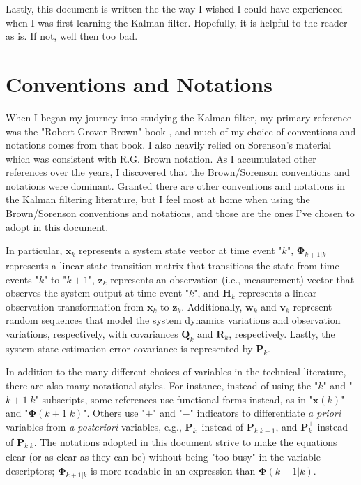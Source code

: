 \documentclass[12pt]{article}
\begin{document}
Lastly, this document is written the the way I wished I could have experienced when I was
first learning the Kalman filter. Hopefully, it is helpful to the reader as is.
If not, well then too bad.

\clearpage



\section{Conventions and Notations}

When I began my journey into studying the Kalman filter, my primary reference was the
"Robert Grover Brown" book \cite{rgbrown1983}, and much of my choice of conventions and
notations comes from that book. I also heavily relied on Sorenson’s material
\cite{sorenson1985} which was consistent with R.G. Brown notation. As I accumulated other
references over the years, I discovered that the Brown/Sorenson conventions and notations
were dominant. Granted there are other conventions and notations in the Kalman filtering
literature, but I feel most at home when using the Brown/Sorenson conventions and notations,
and those are the ones I’ve chosen to adopt in this document.

In particular, $\mathbf{x}_k$ represents a system state vector at time event "$k$",
$\mathbf{\Phi}_{k+1|k}$ represents a linear state transition matrix that transitions the
state from time events "$k$" to "$k+1$",
$\mathbf{z}_k$ represents an observation (i.e., measurement) vector that observes the
system output at time event "$k$",
and $\mathbf{H}_k$ represents a linear observation transformation from $\mathbf{x}_k$
to $\mathbf{z}_k$.
Additionally, $\mathbf{w}_k$ and $\mathbf{v}_k$ represent random sequences that model the
system dynamics variations and observation variations, respectively, with covariances
$\mathbf{Q}_k$ and $\mathbf{R}_k$, respectively.
Lastly, the system state estimation error covariance is represented by $\mathbf{P}_k$.

In addition to the many different choices of variables in the technical literature, there
are also many notational styles.
For instance, instead of using the "$k$" and "$k+1|k$" subscripts, some references use
functional forms instead, as in "$\mathbf{x}(k)$" and "$\mathbf{\Phi}(k+1|k)$".
Others use "$+$" and "$-$" indicators to differentiate \textit{a priori} variables from
\textit{a posteriori} variables, e.g., $\mathbf{P}_k^-$ instead of $\mathbf{P}_{k|k-1}$,
and $\mathbf{P}_k^+$ instead of $\mathbf{P}_{k|k}$.
The notations adopted in this document strive to make the equations clear (or as clear
as they can be) without being "too busy" in the variable descriptors;
$\mathbf{\Phi}_{k+1|k}$ is more readable in an expression than $\mathbf{\Phi}(k+1|k)$.
\end{document}
